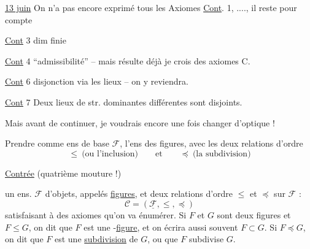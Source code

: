 
\uline{13 juin} On n'a pas encore exprimé tous les Axiomes \uline{Cont}. 1, ...., il reste pour compte

\uline{Cont} 3 dim finie

\uline{Cont} 4 ``admissibilité'' -- mais résulte déjà je crois des axiomes C.

\uline{Cont} 6  disjonction via les lieux -- on y reviendra.

\uline{Cont} 7 Deux lieux de str. dominantes différentes sont disjoints.

Mais avant de continuer, je voudrais encore une fois changer d'optique !

Prendre comme ens de base $\mathcal F$, l'ens des figures, avec les deux relations d'ordre \[ \leq\ \text{(ou l'inclusion)} \qquad \text{et}\qquad \preccurlyeq\ \text{(la subdivision)} \]

\uline{Contrée} (quatrième mouture !)

 un ens. $\mathcal F$ d'objets, appelés \uline{figures}, et deux relations d'ordre $\leq$ et $\preccurlyeq$ sur $\mathcal F$ : \[ \mathcal C=(\underline{\mathcal F},\leq,\preccurlyeq) \] satisfaisant à des axiomes\unsure{,|{}} qu'on va énumérer. Si $F$ et $G$ sont deux figures et $F\leq G$, on dit que $F$ est une -\uline{figure}, et on écrira aussi souvent $F\subset G$. Si $F\preccurlyeq G$, on dit que $F$ est une \uline{subdivision} de $G$, ou que $F$ subdivise $G$.
